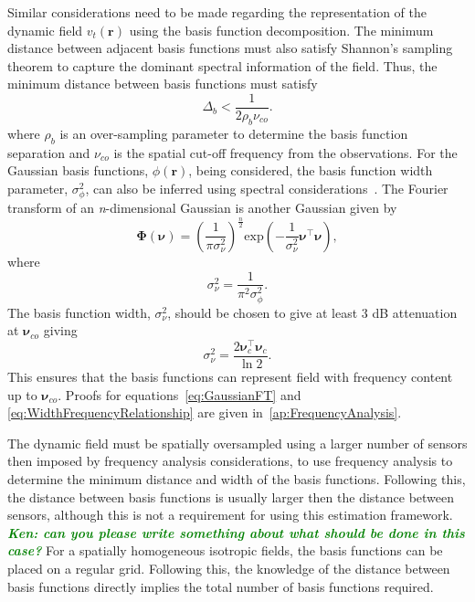 \documentclass[12pt]{iopart}
\newcommand{\omg}[1]{\textsf{\emph{\textbf{\textcolor{green}{#1}}}}}
\begin{document}
Similar considerations need to be made regarding the representation of the dynamic field $v_t(\mathbf{r})$ using the basis function decomposition. The minimum distance between adjacent basis functions must also satisfy Shannon's sampling theorem to capture the dominant spectral information of the field. Thus, the minimum distance between basis functions must satisfy 
\begin{equation}\label{eq:BasisFunctionSeparation}
	\Delta_b < \frac{1}{2\rho_b\nu_{co}}. 
\end{equation}
where $\rho_b$ is an over-sampling parameter to determine the basis function separation and $\nu_{co}$ is the spatial cut-off frequency from the observations. For the Gaussian basis functions, $\phi(\mathbf{r})$, being considered, the basis function width parameter, $\sigma_{\phi}^2$, can also be inferred using spectral considerations~\cite{Sanner1992,Scerri2009}. The Fourier transform of an \textit{n}-dimensional Gaussian is another Gaussian given by
\begin{equation}\label{eq:GaussianFT}
\boldsymbol\Phi(\boldsymbol \nu)=\left(\frac{1}{\pi\sigma_{\nu}^2}\right)^{\frac{n}{2}}\mathrm{exp}\left(-\frac{1}{\sigma_{\nu}^2}\boldsymbol\nu^\top \boldsymbol\nu\right),
\end{equation}
where 
\begin{equation}\label{eq:GaussianFTWidth}
	\sigma^2_{\nu} = \frac{1}{\pi^2\sigma_{\phi}^2}. 
\end{equation}
The basis function width, $\sigma^2_{\nu}$, should be chosen to give at least 3 dB attenuation at $\boldsymbol\nu_{co}$ giving
\begin{equation}\label{eq:WidthFrequencyRelationship}
 \sigma^2_{\nu}=\frac{2\boldsymbol\nu_c^\top \boldsymbol\nu_c}{\ln 2}.
\end{equation}
This ensures that the basis functions can represent field with frequency content up to $\boldsymbol\nu_{co} $. Proofs for equations~\ref{eq:GaussianFT} and \ref{eq:WidthFrequencyRelationship} are given in~\ref{ap:FrequencyAnalysis}.

The dynamic field must be spatially oversampled using a larger number of sensors then imposed by frequency analysis considerations, to use frequency analysis to determine the minimum distance and width of the basis functions. Following this, the distance between basis functions is usually larger then the distance between sensors, although this is not a requirement for using this estimation framework. \omg{Ken: can you please write something about what should be done in this case?} For a spatially homogeneous isotropic fields, the basis functions can be placed on a regular grid. Following this, the knowledge of the distance between basis functions directly implies the total number of basis functions required.
\end{document}
